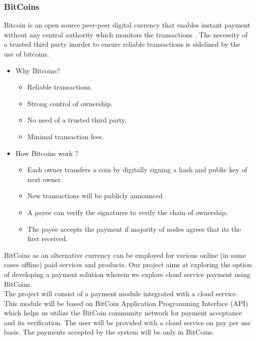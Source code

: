 \documentclass[a4page,12pt]{article}
\begin{document}
\subsubsection{BitCoins}
Bitcoin\cite{bitcoinpaper} is an open source  peer-peer digital currency that enables instant payment without any central authority which monitors the transactions . The necessity of a trusted third party inorder to ensure reliable transactions is sidelined by the use of bitcoins.\\
\begin{itemize}
\item Why Bitcoins?
\begin{itemize}
\item Reliable transactions.
\item Strong control of ownership.
\item No need of a trusted third party.
\item Minimal transaction fees.\\
\end{itemize}
\item How Bitcoins work ?
\begin{itemize}
\item Each owner transfers a coin by digitally signing a hash and public key of next owner.
\item New transactions will be publicly announced .
\item A payee can verify the signatures to verify the chain of ownership. 
\item The payee accepts the payment if majority of nodes agrees that its the first received. 
\end{itemize}
\end{itemize}
\vspace{0.3 in}
BitCoins as an alternative currency can be employed for various online (in some cases offline) paid services and products. Our project aims at exploring the option of developing a payment solution wherein we explore cloud service payment using BitCoins.\\
\linebreak
The project will consist of a payment module integrated with a cloud service. This module will be based on BitCoin Application Programming Interface (API) which helps us utilize the BitCoin community network for payment acceptance and its verification. The user will be provided with a cloud service on pay per use basis. The payments accepted by the system will be only in BitCoins.
\end{document}
